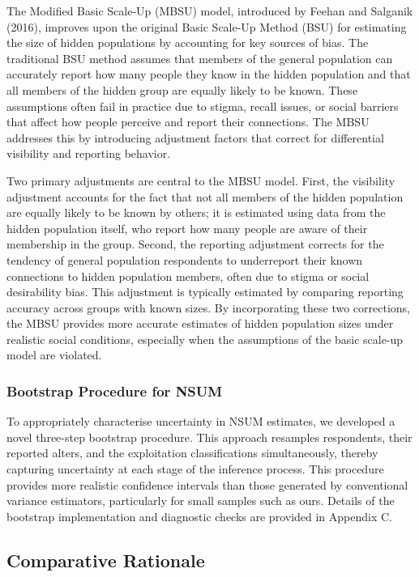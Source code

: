 \documentclass[
  12pt,
  letterpaper,
  DIV=11,
  numbers=noendperiod]{scrartcl}
\theoremstyle{plain}
\theoremstyle{definition}
\begin{document}
The Modified Basic Scale-Up (MBSU) model, introduced by Feehan and
Salganik (2016), improves upon the original Basic Scale-Up Method (BSU)
for estimating the size of hidden populations by accounting for key
sources of bias. The traditional BSU method assumes that members of the
general population can accurately report how many people they know in
the hidden population and that all members of the hidden group are
equally likely to be known. These assumptions often fail in practice due
to stigma, recall issues, or social barriers that affect how people
perceive and report their connections. The MBSU addresses this by
introducing adjustment factors that correct for differential visibility
and reporting behavior.

Two primary adjustments are central to the MBSU model. First, the
visibility adjustment accounts for the fact that not all members of the
hidden population are equally likely to be known by others; it is
estimated using data from the hidden population itself, who report how
many people are aware of their membership in the group. Second, the
reporting adjustment corrects for the tendency of general population
respondents to underreport their known connections to hidden population
members, often due to stigma or social desirability bias. This
adjustment is typically estimated by comparing reporting accuracy across
groups with known sizes. By incorporating these two corrections, the
MBSU provides more accurate estimates of hidden population sizes under
realistic social conditions, especially when the assumptions of the
basic scale-up model are violated.

\subsubsection{Bootstrap Procedure for
NSUM}\label{bootstrap-procedure-for-nsum}

To appropriately characterise uncertainty in NSUM estimates, we
developed a novel three-step bootstrap procedure. This approach
resamples respondents, their reported alters, and the exploitation
classifications simultaneously, thereby capturing uncertainty at each
stage of the inference process. This procedure provides more realistic
confidence intervals than those generated by conventional variance
estimators, particularly for small samples such as ours. Details of the
bootstrap implementation and diagnostic checks are provided in Appendix
C.

\subsection{Comparative Rationale}\label{comparative-rationale}
\end{document}
